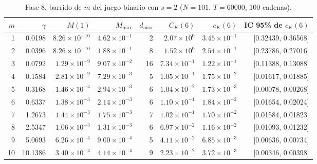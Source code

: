 \documentclass[11pt,letterpaper]{article}
\begin{document}
\begin{table}[H]
\centering
\footnotesize
\setlength{\tabcolsep}{3.5pt}
\caption{Fase 8, barrido de $m$ del juego binario con $s=2$ ($N=101$, $T=60000$, 100 cadenas).}\label{tab:bin2}
\begin{tabular}{rrrrrrrr}
\toprule
$m$ & $\gamma$ & $M(1)$ & $M_{\max}$ & $d_{\max}$ & $C_K(6)$ & $c_K(6)$ & IC 95\% de $c_K(6)$ \\
\midrule
1 & 0.0198 & $8.26\times10^{-10}$ & $4.62\times10^{-1}$ & 2 & $2.07\times10^{0}$ & $3.45\times10^{-1}$ & [0.32439, 0.36568] \\
2 & 0.0396 & $8.26\times10^{-10}$ & $1.88\times10^{-1}$ & 8 & $1.52\times10^{0}$ & $2.54\times10^{-1}$ & [0.23786, 0.27016] \\
3 & 0.0792 & $1.29\times10^{-9}$ & $9.07\times10^{-2}$ & 16 & $7.34\times10^{-1}$ & $1.22\times10^{-1}$ & [0.11388, 0.13088] \\
4 & 0.1584 & $2.81\times10^{-9}$ & $7.29\times10^{-3}$ & 5 & $1.05\times10^{-1}$ & $1.75\times10^{-2}$ & [0.01617, 0.01885] \\
5 & 0.3168 & $1.46\times10^{-4}$ & $2.94\times10^{-3}$ & 6 & $1.04\times10^{-2}$ & $1.73\times10^{-3}$ & [0.00078, 0.00268] \\
6 & 0.6337 & $1.38\times10^{-3}$ & $2.14\times10^{-3}$ & 6 & $1.10\times10^{-1}$ & $1.84\times10^{-2}$ & [0.01654, 0.02024] \\
7 & 1.2673 & $1.44\times10^{-3}$ & $1.75\times10^{-3}$ & 7 & $1.02\times10^{-1}$ & $1.70\times10^{-2}$ & [0.01584, 0.01823] \\
8 & 2.5347 & $1.06\times10^{-3}$ & $1.31\times10^{-3}$ & 6 & $6.97\times10^{-2}$ & $1.16\times10^{-2}$ & [0.01093, 0.01232] \\
9 & 5.0693 & $6.26\times10^{-4}$ & $9.00\times10^{-4}$ & 5 & $4.11\times10^{-2}$ & $6.85\times10^{-3}$ & [0.00636, 0.00734] \\
10 & 10.1386 & $3.40\times10^{-4}$ & $4.14\times10^{-4}$ & 9 & $2.23\times10^{-2}$ & $3.72\times10^{-3}$ & [0.00346, 0.00398] \\
\bottomrule
\end{tabular}
\end{table}
\end{document}
